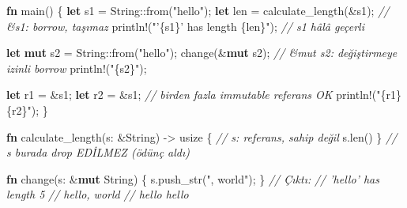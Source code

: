 \documentclass[12pt,a4paper]{article}
\newenvironment{Shaded}{}{}
\newcommand{\CommentTok}[1]{\textcolor[rgb]{0.38,0.63,0.69}{\textit{#1}}}
\newcommand{\DataTypeTok}[1]{\textcolor[rgb]{0.56,0.13,0.00}{#1}}
\newcommand{\FunctionTok}[1]{\textcolor[rgb]{0.02,0.16,0.49}{#1}}
\newcommand{\KeywordTok}[1]{\textcolor[rgb]{0.00,0.44,0.13}{\textbf{#1}}}
\newcommand{\NormalTok}[1]{#1}
\newcommand{\OperatorTok}[1]{\textcolor[rgb]{0.40,0.40,0.40}{#1}}
\newcommand{\StringTok}[1]{\textcolor[rgb]{0.25,0.44,0.63}{#1}}
\begin{document}
\begin{Shaded}
\begin{Highlighting}[]
\KeywordTok{fn} \FunctionTok{main}\OperatorTok{()} \OperatorTok{\{}
    \KeywordTok{let}\NormalTok{ s1 }\OperatorTok{=} \DataTypeTok{String}\OperatorTok{::}\FunctionTok{from}\OperatorTok{(}\StringTok{"hello"}\OperatorTok{);}
    \KeywordTok{let}\NormalTok{ len }\OperatorTok{=} \FunctionTok{calculate\_length}\OperatorTok{(\&}\NormalTok{s1}\OperatorTok{);}          \CommentTok{// \&s1: borrow, taşımaz}
\NormalTok{    println}\OperatorTok{!(}\StringTok{"'\{s1\}' has length \{len\}"}\OperatorTok{);}      \CommentTok{// s1 hâlâ geçerli}

    \KeywordTok{let} \KeywordTok{mut}\NormalTok{ s2 }\OperatorTok{=} \DataTypeTok{String}\OperatorTok{::}\FunctionTok{from}\OperatorTok{(}\StringTok{"hello"}\OperatorTok{);}
    \FunctionTok{change}\OperatorTok{(\&}\KeywordTok{mut}\NormalTok{ s2}\OperatorTok{);}                          \CommentTok{// \&mut s2: değiştirmeye izinli borrow}
\NormalTok{    println}\OperatorTok{!(}\StringTok{"\{s2\}"}\OperatorTok{);}

    \KeywordTok{let}\NormalTok{ r1 }\OperatorTok{=} \OperatorTok{\&}\NormalTok{s1}\OperatorTok{;}
    \KeywordTok{let}\NormalTok{ r2 }\OperatorTok{=} \OperatorTok{\&}\NormalTok{s1}\OperatorTok{;}                              \CommentTok{// birden fazla immutable referans OK}
\NormalTok{    println}\OperatorTok{!(}\StringTok{"\{r1\} \{r2\}"}\OperatorTok{);}
\OperatorTok{\}}

\KeywordTok{fn} \FunctionTok{calculate\_length}\OperatorTok{(}\NormalTok{s}\OperatorTok{:} \OperatorTok{\&}\DataTypeTok{String}\OperatorTok{)} \OperatorTok{-\textgreater{}} \DataTypeTok{usize} \OperatorTok{\{}    \CommentTok{// s: referans, sahip değil}
\NormalTok{    s}\OperatorTok{.}\FunctionTok{len}\OperatorTok{()}
\OperatorTok{\}}                                              \CommentTok{// s burada drop EDİLMEZ (ödünç aldı)}

\KeywordTok{fn} \FunctionTok{change}\OperatorTok{(}\NormalTok{s}\OperatorTok{:} \OperatorTok{\&}\KeywordTok{mut} \DataTypeTok{String}\OperatorTok{)} \OperatorTok{\{}
\NormalTok{    s}\OperatorTok{.}\FunctionTok{push\_str}\OperatorTok{(}\StringTok{", world"}\OperatorTok{);}
\OperatorTok{\}}
\CommentTok{// Çıktı:}
\CommentTok{// 'hello' has length 5}
\CommentTok{// hello, world}
\CommentTok{// hello hello}
\end{Highlighting}
\end{Shaded}
\end{document}
